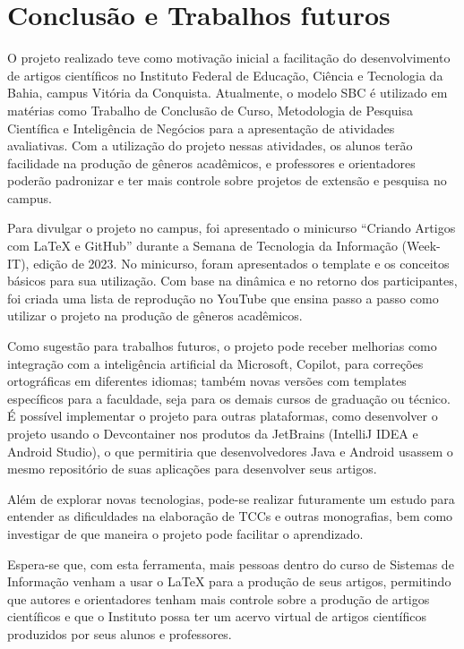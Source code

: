 \section{Conclusão e Trabalhos futuros}

O projeto realizado teve como motivação inicial a facilitação do desenvolvimento de artigos científicos no Instituto Federal de Educação, Ciência e Tecnologia da Bahia, campus Vitória da Conquista. Atualmente, o modelo SBC é utilizado em matérias como Trabalho de Conclusão de Curso, Metodologia de Pesquisa Científica e Inteligência de Negócios para a apresentação de atividades avaliativas. Com a utilização do projeto nessas atividades, os alunos terão facilidade na produção de gêneros acadêmicos, e professores e orientadores poderão padronizar e ter mais controle sobre projetos de extensão e pesquisa no campus.

Para divulgar o projeto no campus, foi apresentado o minicurso ``Criando Artigos com LaTeX e GitHub'' durante a Semana de Tecnologia da Informação (Week-IT), edição de 2023. No minicurso, foram apresentados o template e os conceitos básicos para sua utilização. Com base na dinâmica e no retorno dos participantes, foi criada uma lista de reprodução no YouTube que ensina passo a passo como utilizar o projeto na produção de gêneros acadêmicos.

Como sugestão para trabalhos futuros, o projeto pode receber melhorias como integração com a inteligência artificial da Microsoft, Copilot, para correções ortográficas em diferentes idiomas; também novas versões com templates específicos para a faculdade, seja para os demais cursos de graduação ou técnico. É possível implementar o projeto para outras plataformas, como desenvolver o projeto usando o Devcontainer nos produtos da JetBrains (IntelliJ IDEA e Android Studio), o que permitiria que desenvolvedores Java e Android usassem o mesmo repositório de suas aplicações para desenvolver seus artigos.

Além de explorar novas tecnologias, pode-se realizar futuramente um estudo para entender as dificuldades na elaboração de TCCs e outras monografias, bem como investigar de que maneira o projeto pode facilitar o aprendizado.

Espera-se que, com esta ferramenta, mais pessoas dentro do curso de Sistemas de Informação venham a usar o LaTeX para a produção de seus artigos, permitindo que autores e orientadores tenham mais controle sobre a produção de artigos científicos e que o Instituto possa ter um acervo virtual de artigos científicos produzidos por seus alunos e professores.
